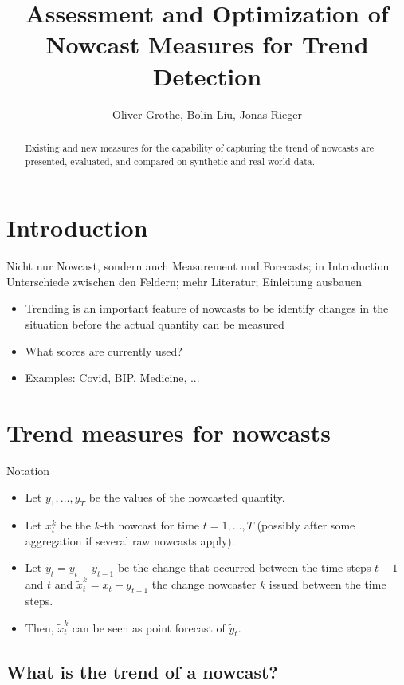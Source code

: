 \documentclass[oneside]{article}
\title{Assessment and Optimization of Nowcast Measures for Trend Detection}
\author{Oliver Grothe, Bolin Liu, Jonas Rieger}
\theoremstyle{plain}%
\theoremstyle{definition}
\newcommand{\ydiff}{\tilde{y}}
\newcommand{\xdiff}{\tilde{x}}
\begin{document}
\maketitle

\begin{abstract}
Existing and new measures for the capability of capturing the trend of nowcasts are presented, evaluated, and compared on synthetic and real-world data.
\end{abstract}

\section{Introduction}

Nicht nur Nowcast, sondern auch Measurement und Forecasts; in Introduction Unterschiede zwischen den Feldern; mehr Literatur; Einleitung ausbauen

\begin{itemize}
	\item Trending is an important feature of nowcasts to be identify changes in the situation before the actual quantity can be measured
	\item What scores are currently used?
	\item Examples: Covid, BIP, Medicine, ... 
\end{itemize}

\section{Trend measures for nowcasts}

Notation
\begin{itemize}
  \item Let $y_1, \ldots, y_T$ be the values of the nowcasted quantity.
  \item Let $x_t^k$ be the $k$-th nowcast for time $t = 1, \ldots, T$ (possibly after some aggregation if several raw nowcasts apply).
  \item Let $\ydiff_t = y_t - y_{t-1}$ be the change that occurred between the time steps $t-1$ and $t$ and $\xdiff_t^k = x_t - y_{t-1}$ the change nowcaster $k$ issued between the time steps. 
  \item Then, $\xdiff_t^k$ can be seen as point forecast of $\ydiff_t$. 
\end{itemize}


\subsection{What is the trend of a nowcast?}
\end{document}
